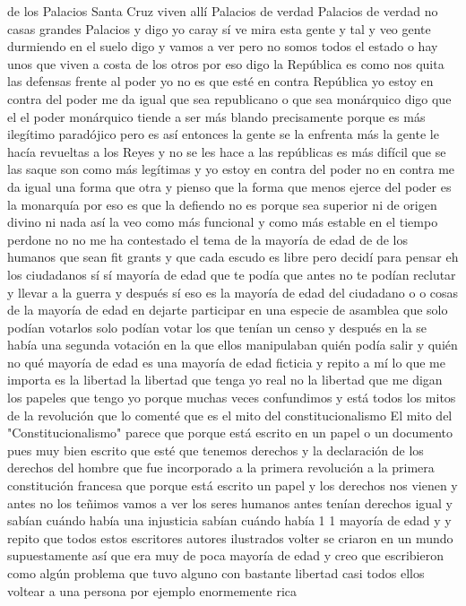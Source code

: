 de los Palacios Santa Cruz viven allí Palacios de verdad Palacios de verdad no casas grandes Palacios
y digo yo caray sí ve mira esta gente y tal y veo gente durmiendo en el suelo digo y vamos a ver pero no somos todos el estado
o hay unos que viven a costa de los otros
por eso digo la República es como nos quita las defensas frente al poder
yo no es que esté en contra República yo estoy en contra del poder me da igual que sea republicano o que sea monárquico digo que el el poder monárquico
tiende a ser más blando precisamente porque es más ilegítimo paradójico pero es así entonces
la gente se la enfrenta más la gente le hacía revueltas a los Reyes y no se les hace a las repúblicas es más difícil que se las saque
son como más legítimas y yo estoy en contra del poder no en contra me da igual una forma que otra y pienso que la forma
que menos ejerce del poder es la monarquía por eso es que la defiendo no es porque sea superior ni de origen divino ni nada así
la veo como más funcional y como más estable en el tiempo
perdone no no me ha contestado el tema de la mayoría de edad de de los humanos que sean fit grants y que cada escudo es libre
pero decidí para pensar eh los ciudadanos sí sí mayoría de edad que te podía
que antes no te podían reclutar y llevar a la guerra y después sí eso es la mayoría de edad del ciudadano o o cosas de la mayoría de edad
en dejarte participar en una especie de asamblea que solo podían votarlos solo podían votar los que tenían un censo
y después en la se había una segunda votación en la que ellos manipulaban quién podía salir y quién no qué mayoría de edad
es una mayoría de edad ficticia y repito a mí lo que me importa es la libertad la libertad que tenga yo real no la libertad que me digan los papeles que tengo yo
porque muchas veces confundimos y está todos los mitos de la revolución que lo comenté que es el mito del constitucionalismo
El mito del "Constitucionalismo"
parece que porque está escrito en un papel o un documento pues muy bien escrito que esté que tenemos derechos y
la declaración de los derechos del hombre que fue incorporado a la primera revolución a la primera constitución francesa que porque está escrito un papel
y los derechos nos vienen y antes no los teñimos vamos a ver los seres humanos antes tenían derechos igual y sabían cuándo había una injusticia
sabían cuándo había 1 1 mayoría de edad y y repito que todos estos escritores autores ilustrados
volter se criaron en un mundo supuestamente así que era muy de poca mayoría de edad y creo que escribieron
como algún problema que tuvo alguno con bastante libertad casi todos ellos voltear a una persona por ejemplo enormemente rica
